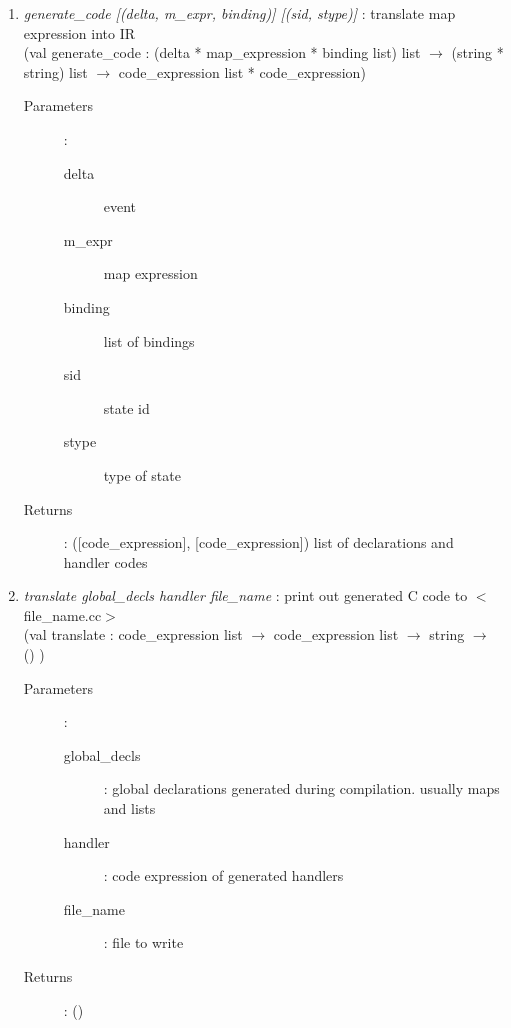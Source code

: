 \documentclass{article}
\begin{document}
\begin{enumerate}
  \item \emph{generate\_code [(delta, m\_expr, binding)] [(sid, stype)]} : translate map expression into IR\\
  (val generate\_code : (delta * map\_expression * binding list) list $\rightarrow$ (string * string) list $\rightarrow$ code\_expression list * code\_expression)
      \begin{description}
      \item[Parameters] :
        \begin{description}
          \item[delta] event
          \item[m\_expr] map expression
          \item[binding] list of bindings
          \item[sid] state id
          \item[stype] type of state
        \end{description}
      \item[Returns] : ([code\_expression], [code\_expression]) list of declarations and handler codes
    \end{description}
    
  \item \emph{translate global\_decls handler file\_name} : print out generated C code to $<$file\_name.cc$>$\\
  (val translate : code\_expression list $\rightarrow$ code\_expression list $\rightarrow$ string $\rightarrow$ () \;)
      \begin{description}
      \item[Parameters] :
        \begin{description}
          \item[global\_decls] : global declarations generated during compilation. usually maps and lists
          \item[handler] : code expression of generated handlers
          \item[file\_name] : file to write 
        \end{description}
      \item[Returns] : ()
    \end{description}
    

\end{enumerate}
\end{document}
